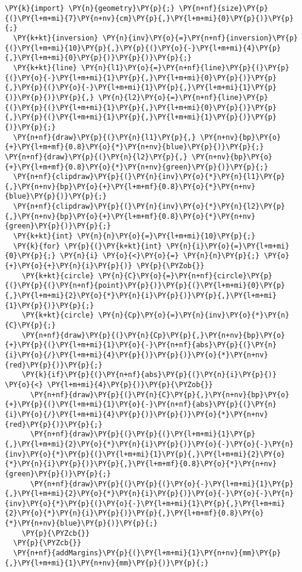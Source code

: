 \begin{Verbatim}[commandchars=\\\{\}]
  \PY{k}{import} \PY{n}{geometry}\PY{p}{;} \PY{n+nf}{size}\PY{p}{(}\PY{l+m+mi}{7}\PY{n+nv}{cm}\PY{p}{,}\PY{l+m+mi}{0}\PY{p}{)}\PY{p}{;}
  \PY{k+kt}{inversion} \PY{n}{inv}\PY{o}{=}\PY{n+nf}{inversion}\PY{p}{(}\PY{l+m+mi}{10}\PY{p}{,}\PY{p}{(}\PY{o}{-}\PY{l+m+mi}{4}\PY{p}{,}\PY{l+m+mi}{0}\PY{p}{)}\PY{p}{)}\PY{p}{;}
  \PY{k+kt}{line} \PY{n}{l1}\PY{o}{=}\PY{n+nf}{line}\PY{p}{(}\PY{p}{(}\PY{o}{-}\PY{l+m+mi}{1}\PY{p}{,}\PY{l+m+mi}{0}\PY{p}{)}\PY{p}{,}\PY{p}{(}\PY{o}{-}\PY{l+m+mi}{1}\PY{p}{,}\PY{l+m+mi}{1}\PY{p}{)}\PY{p}{)}\PY{p}{,} \PY{n}{l2}\PY{o}{=}\PY{n+nf}{line}\PY{p}{(}\PY{p}{(}\PY{l+m+mi}{1}\PY{p}{,}\PY{l+m+mi}{0}\PY{p}{)}\PY{p}{,}\PY{p}{(}\PY{l+m+mi}{1}\PY{p}{,}\PY{l+m+mi}{1}\PY{p}{)}\PY{p}{)}\PY{p}{;}
  \PY{n+nf}{draw}\PY{p}{(}\PY{n}{l1}\PY{p}{,} \PY{n+nv}{bp}\PY{o}{+}\PY{l+m+mf}{0.8}\PY{o}{*}\PY{n+nv}{blue}\PY{p}{)}\PY{p}{;} \PY{n+nf}{draw}\PY{p}{(}\PY{n}{l2}\PY{p}{,} \PY{n+nv}{bp}\PY{o}{+}\PY{l+m+mf}{0.8}\PY{o}{*}\PY{n+nv}{green}\PY{p}{)}\PY{p}{;}
  \PY{n+nf}{clipdraw}\PY{p}{(}\PY{n}{inv}\PY{o}{*}\PY{n}{l1}\PY{p}{,}\PY{n+nv}{bp}\PY{o}{+}\PY{l+m+mf}{0.8}\PY{o}{*}\PY{n+nv}{blue}\PY{p}{)}\PY{p}{;}
  \PY{n+nf}{clipdraw}\PY{p}{(}\PY{n}{inv}\PY{o}{*}\PY{n}{l2}\PY{p}{,}\PY{n+nv}{bp}\PY{o}{+}\PY{l+m+mf}{0.8}\PY{o}{*}\PY{n+nv}{green}\PY{p}{)}\PY{p}{;}
  \PY{k+kt}{int} \PY{n}{n}\PY{o}{=}\PY{l+m+mi}{10}\PY{p}{;}
  \PY{k}{for} \PY{p}{(}\PY{k+kt}{int} \PY{n}{i}\PY{o}{=}\PY{l+m+mi}{0}\PY{p}{;} \PY{n}{i} \PY{o}{<}\PY{o}{=} \PY{n}{n}\PY{p}{;} \PY{o}{+}\PY{o}{+}\PY{n}{i}\PY{p}{)} \PY{p}{\PYZob{}}
    \PY{k+kt}{circle} \PY{n}{C}\PY{o}{=}\PY{n+nf}{circle}\PY{p}{(}\PY{p}{(}\PY{n+nf}{point}\PY{p}{)}\PY{p}{(}\PY{l+m+mi}{0}\PY{p}{,}\PY{l+m+mi}{2}\PY{o}{*}\PY{n}{i}\PY{p}{)}\PY{p}{,}\PY{l+m+mi}{1}\PY{p}{)}\PY{p}{;}
    \PY{k+kt}{circle} \PY{n}{Cp}\PY{o}{=}\PY{n}{inv}\PY{o}{*}\PY{n}{C}\PY{p}{;}
    \PY{n+nf}{draw}\PY{p}{(}\PY{n}{Cp}\PY{p}{,}\PY{n+nv}{bp}\PY{o}{+}\PY{p}{(}\PY{l+m+mi}{1}\PY{o}{-}\PY{n+nf}{abs}\PY{p}{(}\PY{n}{i}\PY{o}{/}\PY{l+m+mi}{4}\PY{p}{)}\PY{p}{)}\PY{o}{*}\PY{n+nv}{red}\PY{p}{)}\PY{p}{;}
    \PY{k}{if}\PY{p}{(}\PY{n+nf}{abs}\PY{p}{(}\PY{n}{i}\PY{p}{)} \PY{o}{<} \PY{l+m+mi}{4}\PY{p}{)}\PY{p}{\PYZob{}}
      \PY{n+nf}{draw}\PY{p}{(}\PY{n}{C}\PY{p}{,}\PY{n+nv}{bp}\PY{o}{+}\PY{p}{(}\PY{l+m+mi}{1}\PY{o}{-}\PY{n+nf}{abs}\PY{p}{(}\PY{n}{i}\PY{o}{/}\PY{l+m+mi}{4}\PY{p}{)}\PY{p}{)}\PY{o}{*}\PY{n+nv}{red}\PY{p}{)}\PY{p}{;}
      \PY{n+nf}{draw}\PY{p}{(}\PY{p}{(}\PY{l+m+mi}{1}\PY{p}{,}\PY{l+m+mi}{2}\PY{o}{*}\PY{n}{i}\PY{p}{)}\PY{o}{-}\PY{o}{-}\PY{n}{inv}\PY{o}{*}\PY{p}{(}\PY{l+m+mi}{1}\PY{p}{,}\PY{l+m+mi}{2}\PY{o}{*}\PY{n}{i}\PY{p}{)}\PY{p}{,}\PY{l+m+mf}{0.8}\PY{o}{*}\PY{n+nv}{green}\PY{p}{)}\PY{p}{;}
      \PY{n+nf}{draw}\PY{p}{(}\PY{p}{(}\PY{o}{-}\PY{l+m+mi}{1}\PY{p}{,}\PY{l+m+mi}{2}\PY{o}{*}\PY{n}{i}\PY{p}{)}\PY{o}{-}\PY{o}{-}\PY{n}{inv}\PY{o}{*}\PY{p}{(}\PY{o}{-}\PY{l+m+mi}{1}\PY{p}{,}\PY{l+m+mi}{2}\PY{o}{*}\PY{n}{i}\PY{p}{)}\PY{p}{,}\PY{l+m+mf}{0.8}\PY{o}{*}\PY{n+nv}{blue}\PY{p}{)}\PY{p}{;}
    \PY{p}{\PYZcb{}}
  \PY{p}{\PYZcb{}}
  \PY{n+nf}{addMargins}\PY{p}{(}\PY{l+m+mi}{1}\PY{n+nv}{mm}\PY{p}{,}\PY{l+m+mi}{1}\PY{n+nv}{mm}\PY{p}{)}\PY{p}{;}
\end{Verbatim}
